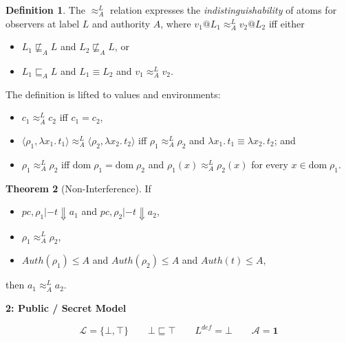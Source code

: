 \documentclass{article}
\makeatletter
\newcommand{\at}{\ensuremath{{\scriptstyle{@}}}}
\newcommand{\pc}{\ensuremath{{\mathit{pc}}}}
\theoremstyle{definition}
\newtheorem{theorem}{Theorem}
\newtheorem{definition}[theorem]{Definition}
\makeatother
\begin{document}
\begin{definition}
  The $\approx^{L}_{A}$ relation expresses the \emph{indistinguishability} of
  atoms for observers at label $L$ and authority $A$, where
  $v_1 \at L_1 \approx^{L}_{A} v_2 \at L_2$ iff either
  \begin{itemize}
  \item $L_1 \not\sqsubseteq_{A} L$ and $L_2 \not\sqsubseteq_{A} L$, or
  \item $L_1 \sqsubseteq_{A} L$ and $L_1 \equiv L_2$ and
    $v_1 \approx^{L}_{A} v_2$.
  \end{itemize}
  The definition is lifted to values and environments:
  \begin{itemize}
  \item
    $c_1 \approx^{L}_{A} c_2$ iff $c_1 = c_2$,
  \item
    $\langle{\rho_1, \lambda{x_1}.\, t_1\rangle} \approx^{L}_{A}
    \langle{\rho_2, \lambda{x_2}.\, t_2\rangle}$ iff
    $\rho_1 \approx^{L}_{A} \rho_2$ and
    $\lambda{x_1}.\, t_1 \equiv \lambda{x_2}.\, t_2$; and
  \item
    $\rho_1 \approx^{L}_{A} \rho_2$ iff
    $\mathrm{dom}\; \rho_1 = \mathrm{dom}\; \rho_2$ and
    $\rho_1(x) \approx^{L}_{A} \rho_2(x)$
    for every $x \in \mathrm{dom}\; \rho_1$.
  \end{itemize}
\end{definition}

\begin{theorem}[Non-Interference]
  If
  \begin{itemize}
  \item $\pc, \rho_1 |- t \Downarrow a_1$ and 
    $\pc, \rho_2 |- t \Downarrow a_2$,
  \item $\rho_1 \approx^{L}_{A} \rho_2$,
  \item $\mathit{Auth}(\rho_1) \leq A$ and $\mathit{Auth}(\rho_2) \leq A$ and
    $\mathit{Auth}(t) \leq A$,
  \end{itemize}
  then $a_1 \approx^{L}_{A} a_2$.
\end{theorem}

\pagebreak

\begin{flushleft}
  \textbf{2: Public / Secret Model}
\end{flushleft}
\[
\mathcal{L} = \{ \bot, \top \}
\qquad
\bot \sqsubseteq \top
\qquad
L^{\mathit{def}} = \bot
\qquad
\mathcal{A} = \mathbf{1}
\]
\end{document}
